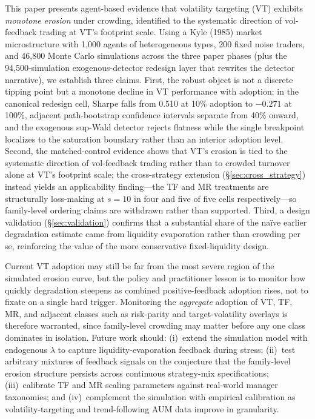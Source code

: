 \documentclass[12pt,a4paper]{article}
\begin{document}
This paper presents agent-based evidence that volatility targeting (VT) exhibits \emph{monotone erosion} under crowding, identified to the systematic direction of vol-feedback trading at VT's footprint scale. Using a Kyle (1985) market microstructure with 1{,}000 agents of heterogeneous types, 200 fixed noise traders, and 46{,}800 Monte Carlo simulations across the three paper phases (plus the 94{,}500-simulation exogenous-detector redesign layer that rewrites the detector narrative), we establish three claims. First, the robust object is not a discrete tipping point but a monotone decline in VT performance with adoption: in the canonical redesign cell, Sharpe falls from 0.510 at 10\% adoption to $-0.271$ at 100\%, adjacent path-bootstrap confidence intervals separate from 40\% onward, and the exogenous sup-Wald detector rejects flatness while the single breakpoint localizes to the saturation boundary rather than an interior adoption level. Second, the matched-control evidence shows that VT's erosion is tied to the systematic direction of vol-feedback trading rather than to crowded turnover alone at VT's footprint scale; the cross-strategy extension (\S\ref{sec:cross_strategy}) instead yields an applicability finding---the TF and MR treatments are structurally loss-making at $s=10$ in four and five of five cells respectively---so family-level ordering claims are withdrawn rather than supported. Third, a design validation (\S\ref{sec:validation}) confirms that a substantial share of the na\"ive earlier degradation estimate came from liquidity evaporation rather than crowding per se, reinforcing the value of the more conservative fixed-liquidity design.

Current VT adoption may still be far from the most severe region of the simulated erosion curve, but the policy and practitioner lesson is to monitor how quickly degradation steepens as combined positive-feedback adoption rises, not to fixate on a single hard trigger. Monitoring the \emph{aggregate} adoption of VT, TF, MR, and adjacent classes such as risk-parity and target-volatility overlays is therefore warranted, since family-level crowding may matter before any one class dominates in isolation. Future work should: (i)~extend the simulation model with endogenous $\lambda$ to capture liquidity-evaporation feedback during stress; (ii)~test arbitrary mixtures of feedback signals on the conjecture that the family-level erosion structure persists across continuous strategy-mix specifications; (iii)~calibrate TF and MR scaling parameters against real-world manager taxonomies; and (iv)~complement the simulation with empirical calibration as volatility-targeting and trend-following AUM data improve in granularity.
\end{document}
